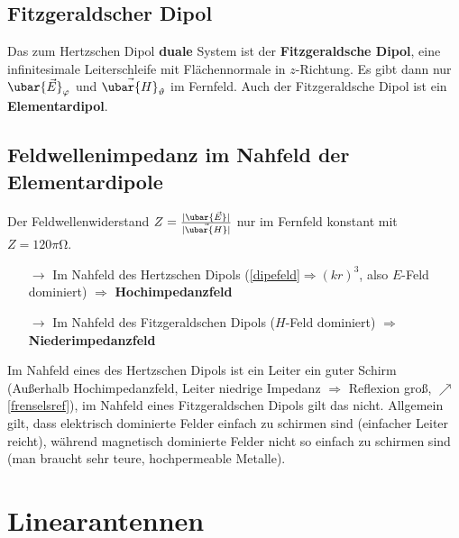 		\subsection{Fitzgeraldscher Dipol}
		    Das zum Hertzschen Dipol \textbf{duale} System ist der \textbf{Fitzgeraldsche Dipol}, eine infinitesimale Leiterschleife mit Flächennormale in \(z\)-Richtung. Es gibt dann  nur \(\ubar{\vec{E}}_\varphi\) und \(\vec{\ubar{H}}_\vartheta\) im Fernfeld. Auch der Fitzgeraldsche Dipol ist ein \textbf{Elementardipol}.
		  
\subsection{Feldwellenimpedanz im Nahfeld der Elementardipole}  
Der Feldwellenwiderstand \(Z=\frac{|\ubar{\vec{E}}|}{|\vec{\ubar{H}}|}\) nur im Fernfeld konstant mit \(Z=120\pi\mathrm{\Omega}\).
\begin{itemize}
	\item[$\to$] Im Nahfeld des Hertzschen Dipols (\ref{dipefeld}$\Rightarrow(kr)^3$, also $E$-Feld dominiert) $\Rightarrow$ \textbf{Hochimpedanzfeld}
	\item[$\to$] Im Nahfeld des Fitzgeraldschen Dipols ($H$-Feld dominiert) $\Rightarrow$ \textbf{Niederimpedanzfeld}
\end{itemize}
Im Nahfeld eines des Hertzschen Dipols ist ein Leiter ein guter Schirm (Außerhalb Hochimpedanzfeld, Leiter niedrige Impedanz $\Rightarrow$ Reflexion groß, $\nearrow$\ref{frenselsref}), im Nahfeld eines Fitzgeraldschen Dipols gilt das nicht. Allgemein gilt, dass elektrisch dominierte Felder einfach zu schirmen sind (einfacher Leiter reicht), während magnetisch dominierte Felder nicht so einfach zu schirmen sind (man braucht sehr teure, hochpermeable Metalle).
  \section{Linearantennen}
